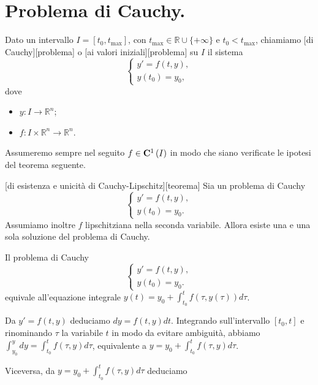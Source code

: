 \section{Problema di Cauchy.}
\label{EquazioniDifferenziali_ProblemaDiCauchy}
\begin{Definition}
	Dato un intervallo $I = [t_0,t_{\text{max}}]$, con
  $t_{\text{max}} \in \mathbb{R} \cup \lbrace + \infty \rbrace$ e
  $t_0 < t_{\text{max}}$, chiamiamo
  [di Cauchy][problema] o
  [ai valori iniziali][problema] su $I$ il
  sistema
	\[
	\begin{cases}
		y' = f(t,y),\\
		y(t_0) = y_0,
	\end{cases}
	\]
	dove
	\begin{itemize}
		\item $y: I \rightarrow \mathbb{R}^n$;
		\item $f: I \times \mathbb{R}^n \rightarrow \mathbb{R}^n$.
	\end{itemize}
\end{Definition}
\par Assumeremo sempre nel seguito $f \in \CClass{1}[I]$ in modo che siano verificate le ipotesi del teorema seguente.
\begin{Theorem}
	[di esistenza e unicit\`a di Cauchy-Lipschitz][teorema]
	Sia un problema di Cauchy
	\[
		\begin{cases}
			y' = f(t,y),\\
			y(t_0) = y_0.
		\end{cases}
	\]
	Assumiamo inoltre $f$ lipschitziana nella seconda variabile. Allora esiste una e una sola soluzione del problema di Cauchy.
\end{Theorem}
\begin{Theorem}
	Il problema di Cauchy
	\[
		\begin{cases}
			y' = f(t,y),\\
			y(t_0) = y_0.
		\end{cases}
	\]
	equivale all'equazione integrale $y(t) = y_0 + \int_{t_0}^t f(\tau,y(\tau)) d\tau$.
\end{Theorem}
\Proof Da $y' = f(t,y)$ deduciamo $dy = f(t,y)dt$. Integrando sull'intervallo $[t_0,t]$ e rinominando $\tau$ la variabile $t$ in modo da evitare ambiguit\`a, abbiamo $\int_{y_0}^y dy = \int_{t_0}^t f(\tau,y)d\tau$, equivalente a $y = y_0 + \int_{t_0}^t f(\tau,y)d\tau$.
\par Viceversa, da $y = y_0 + \int_{t_0}^t f(\tau,y)d\tau$ deduciamo
